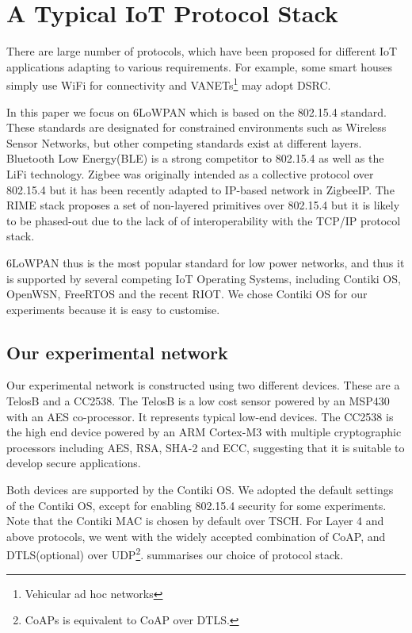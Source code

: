 \documentclass{article}
\begin{document}
\section{A Typical IoT Protocol Stack\label{sec: IotProtocols}} 

There are large number of protocols, which have been proposed for different IoT applications adapting to various requirements. For example, some smart houses simply use WiFi for connectivity and VANETs\footnote{Vehicular ad hoc networks} may adopt DSRC\cite{DSRC}. 

In this paper we focus on 6LoWPAN\cite{rfc4944} which is based on the 802.15.4\cite{802154} standard. These standards are designated for constrained environments such as Wireless Sensor Networks,  but other competing standards exist at different layers. Bluetooth Low Energy(BLE)\cite{BLE} is a strong competitor to 802.15.4 as well as the LiFi\cite{LiFi} technology. Zigbee\cite{Zigbee} was originally intended as a collective protocol over 802.15.4 but it has been recently adapted to IP-based network in ZigbeeIP\cite{ZigbeeIp}. The RIME stack\cite{RIME} proposes a set of non-layered primitives over 802.15.4 but it is likely to be phased-out due to the lack of of interoperability with the TCP/IP protocol stack. 

6LoWPAN thus is the most popular standard for low power networks, and thus it is supported by several competing IoT Operating Systems, including Contiki OS\cite{Contiki}, OpenWSN\cite{OpenWSN}, FreeRTOS\cite{FreeRTOS} and the recent RIOT\cite{RIOT}. We chose Contiki OS for our experiments because it is easy to customise.

\subsection{Our experimental network}
Our experimental network is constructed using two different devices. These are a TelosB\cite{TelosB} and a CC2538\cite{CC2538}. The TelosB is a low cost sensor powered by an MSP430 with an AES co-processor. It represents typical low-end devices. The CC2538 is the high end device powered by an ARM Cortex-M3 with multiple cryptographic processors including AES, RSA, SHA-2 and ECC, suggesting that it is suitable to develop secure applications. %

Both devices are supported by the Contiki OS. We adopted the default settings of the Contiki OS, except for enabling 802.15.4 security\cite{802154} for some experiments. Note that the Contiki MAC\cite{ContikiMAC} is chosen by default over TSCH\cite{TSCH}. For Layer 4\cite{OSI} and above protocols, we went with the widely accepted combination of CoAP\cite{rfc7252}, and DTLS\cite{rfc6347}(optional) over UDP\cite{rfc768}\footnote{CoAPs is equivalent to CoAP over DTLS.}.  summarises our choice of protocol stack.
\end{document}
